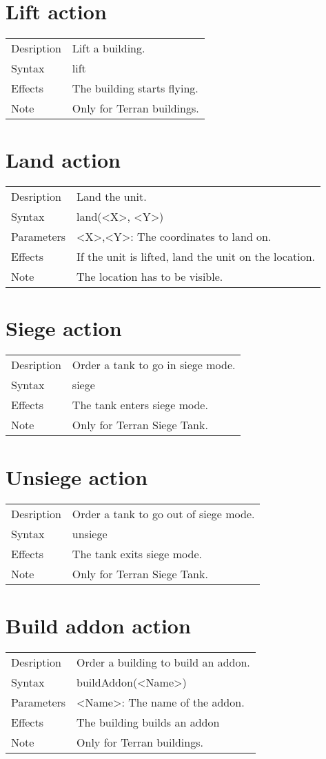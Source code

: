 \documentclass[english,11pt]{report}
\begin{document}
\section{Lift action}
\begin{tabularx}{\textwidth}{lX}
 Desription & Lift a building. \\
 Syntax & lift \\
 Effects &  The building starts flying.\\
 Note & Only for Terran buildings.
\end{tabularx}

\section{Land action}
\begin{tabularx}{\textwidth}{lX}
 Desription & Land the unit. \\
 Syntax & land(<X>, <Y>) \\
 Parameters & <X>,<Y>: The coordinates to land on.\\
 Effects &  If the unit is lifted, land the unit on the location.\\
 Note & The location has to be visible.
\end{tabularx}

\section{Siege action}
\begin{tabularx}{\textwidth}{lX}
 Desription & Order a tank to go in siege mode. \\
 Syntax & siege \\
 Effects &  The tank enters siege mode.\\
 Note & Only for Terran Siege Tank.
\end{tabularx}

\section{Unsiege action}
\begin{tabularx}{\textwidth}{lX}
 Desription & Order a tank to go out of siege mode. \\
 Syntax & unsiege \\
 Effects &  The tank exits siege mode.\\
 Note & Only for Terran Siege Tank.
\end{tabularx}

\section{Build addon action}
\begin{tabularx}{\textwidth}{lX}
 Desription & Order a building to build an addon. \\
 Syntax & buildAddon(<Name>) \\
 Parameters & <Name>: The name of the addon.\\
 Effects &  The building builds an addon\\
 Note & Only for Terran buildings.
\end{tabularx}
\end{document}
